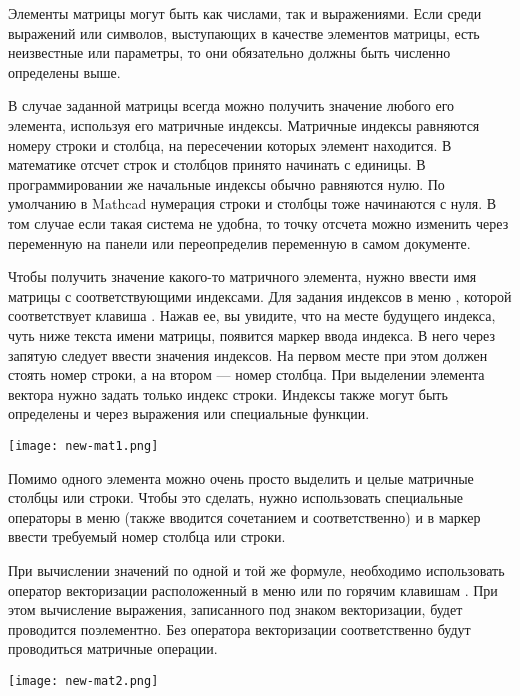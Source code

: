 Элементы матрицы могут быть как числами, так и выражениями. Если среди выражений или символов, выступающих в качестве элементов матрицы, есть неизвестные или параметры, то они обязательно должны быть численно определены выше.


В случае заданной матрицы всегда можно получить значение любого его элемента, используя его матричные индексы. Матричные индексы равняются номеру строки и столбца, на пересечении которых элемент находится. В математике отсчет строк и столбцов принято начинать с единицы. В программировании же начальные индексы обычно равняются нулю. По умолчанию в Mathcad нумерация строки и столбцы тоже начинаются с нуля. В том случае если такая система не удобна, то точку отсчета можно изменить через переменную  на панели   или переопределив переменную в самом документе.

Чтобы получить значение какого-то матричного элемента, нужно ввести имя матрицы с соответствующими индексами. Для задания индексов  в меню , которой соответствует клавиша \keys{[}. Нажав ее, вы увидите, что на месте будущего индекса, чуть ниже текста имени матрицы, появится маркер ввода индекса. В него через запятую следует ввести значения индексов. На первом месте при этом должен стоять номер строки, а на втором --- номер столбца. При выделении элемента вектора нужно задать только индекс строки. Индексы также могут быть определены и через выражения или специальные функции.
\begin{center}
	\texttt{[image: new-mat1.png]}
\end{center}


Помимо одного элемента можно очень просто выделить и целые матричные столбцы или строки. Чтобы это сделать, нужно использовать специальные операторы в меню  (также вводится сочетанием  и   соответственно)  и в маркер ввести требуемый номер столбца или строки.

При вычислении значений по одной и той же формуле, необходимо использовать оператор векторизации расположенный в меню  или по горячим клавишам \keys{\ctrl+\shift+\textasciicircum}. При этом вычисление выражения, записанного под знаком векторизации, будет проводится поэлементно. Без оператора векторизации соответственно будут проводиться матричные операции.
\begin{center}
	\texttt{[image: new-mat2.png]}
\end{center}


